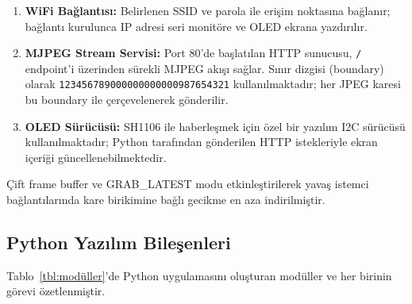 \begin{enumerate}
  \item \textbf{WiFi Bağlantısı:} Belirlenen SSID ve parola ile erişim noktasına bağlanır; bağlantı kurulunca IP adresi seri monitöre ve OLED ekrana yazdırılır.
  \item \textbf{MJPEG Stream Servisi:} Port 80'de başlatılan HTTP sunucusu, \texttt{/} endpoint'i üzerinden sürekli MJPEG akışı sağlar. Sınır dizgisi (boundary) olarak \texttt{123456789000000000000987654321} kullanılmaktadır; her JPEG karesi bu boundary ile çerçevelenerek gönderilir.
  \item \textbf{OLED Sürücüsü:} SH1106 ile haberleşmek için özel bir yazılım I2C sürücüsü kullanılmaktadır; Python tarafından gönderilen HTTP istekleriyle ekran içeriği güncellenebilmektedir.
\end{enumerate}

Çift frame buffer ve GRAB\_LATEST modu etkinleştirilerek yavaş istemci bağlantılarında kare birikimine bağlı gecikme en aza indirilmiştir.

\subsection{Python Yazılım Bileşenleri}

Tablo~\ref{tbl:modüller}'de Python uygulamasını oluşturan modüller ve her birinin görevi özetlenmiştir.

